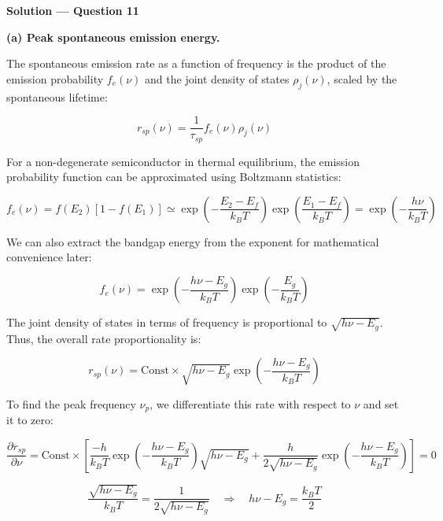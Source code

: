 \textbf{\large Solution --- Question 11}

\textbf{(a) Peak spontaneous emission energy.}

The spontaneous emission rate as a function of frequency is the product of the emission probability $f_e(\nu)$ and the joint density of states $\rho_j(\nu)$, scaled by the spontaneous lifetime:

\begin{equation*}
  r_{sp}(\nu) = \frac{1}{\tau_{sp}} f_e(\nu) \rho_j(\nu)
\end{equation*}

For a non-degenerate semiconductor in thermal equilibrium, the emission probability function can be approximated using Boltzmann statistics:

\begin{equation*}
  f_e(\nu) = f(E_2)[1 - f(E_1)] \simeq \exp\left(-\frac{E_2 - E_f}{k_B T}\right) \exp\left(\frac{E_1 - E_f}{k_B T}\right) = \exp\left(-\frac{h\nu}{k_B T}\right)
\end{equation*}

We can also extract the bandgap energy from the exponent for mathematical convenience later:

\begin{equation*}
  f_e(\nu) = \exp\left(-\frac{h\nu - E_g}{k_B T}\right) \exp\left(-\frac{E_g}{k_B T}\right)
\end{equation*}

The joint density of states in terms of frequency is proportional to $\sqrt{h\nu - E_g}$. Thus, the overall rate proportionality is:

\begin{equation*}
  r_{sp}(\nu) = \text{Const} \times \sqrt{h\nu - E_g} \exp\left(-\frac{h\nu - E_g}{k_B T}\right)
\end{equation*}

To find the peak frequency $\nu_p$, we differentiate this rate with respect to $\nu$ and set it to zero:

\begin{equation*}
  \frac{\partial r_{sp}}{\partial \nu} = \text{Const} \times \left[ \frac{-h}{k_B T} \exp\left(-\frac{h\nu - E_g}{k_B T}\right) \sqrt{h\nu - E_g} + \frac{h}{2\sqrt{h\nu - E_g}} \exp\left(-\frac{h\nu - E_g}{k_B T}\right) \right] = 0
\end{equation*}

\begin{equation*}
  \frac{\sqrt{h\nu - E_g}}{k_B T} = \frac{1}{2\sqrt{h\nu - E_g}} \quad\Longrightarrow\quad h\nu - E_g = \frac{k_B T}{2}
\end{equation*}

